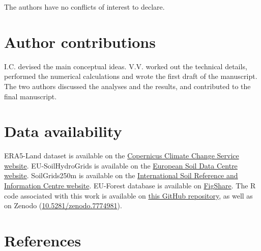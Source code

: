 \documentclass[11pt,]{article}
\begin{document}
The authors have no conflicts of interest to declare.

\hypertarget{author-contributions}{%
\section{Author contributions}\label{author-contributions}}

I.C. devised the main conceptual ideas. V.V. worked out the technical
details, performed the numerical calculations and wrote the first draft
of the manuscript. The two authors discussed the analyses and the
results, and contributed to the final manuscript.

\hypertarget{data-availability}{%
\section{Data availability}\label{data-availability}}

ERA5-Land dataset is available on the
\href{https://cds.climate.copernicus.eu/cdsapp\#!/dataset/reanalysis-era5-land?tab=overview}{Copernicus
Climate Change Service website}. EU-SoilHydroGrids is available on the
\href{https://esdac.jrc.ec.europa.eu/content/3d-soil-hydraulic-database-europe-1-km-and-250-m-resolution}{European
Soil Data Centre website}. SoilGrids250m is available on the
\href{https://www.isric.org/explore/soilgrids}{International Soil
Reference and Information Centre website}. EU-Forest database is
available on
\href{https://figshare.com/collections/A_high-resolution_pan-European_tree_occurrence_dataset/3288407}{FigShare}.
The R code associated with this work is available on
\href{https://github.com/vvandermeersch/inverse_calibration}{this GitHub
repository}, as well as on Zenodo
(\href{https://doi.org/10.5281/zenodo.7774981}{10.5281/zenodo.7774981}).

\hypertarget{references}{%
\section{References}\label{references}}

\setlength{\parindent}{-0.2in}
\setlength{\leftskip}{0.2in}
\setlength{\parskip}{8pt}
\vspace*{-0.2in}

\noindent
\end{document}
